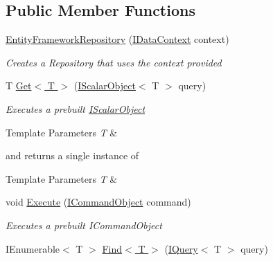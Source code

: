 \subsection*{Public Member Functions}
\begin{DoxyCompactItemize}
\item 
\hyperlink{class_highway_1_1_data_1_1_entity_framework_1_1_repositories_1_1_entity_framework_repository_a9f5b6355d4a5054c37bcd19a6a444aca}{Entity\-Framework\-Repository} (\hyperlink{interface_highway_1_1_data_1_1_interfaces_1_1_i_data_context}{I\-Data\-Context} context)
\begin{DoxyCompactList}\small\item\em Creates a Repository that uses the context provided \end{DoxyCompactList}\item 
T \hyperlink{class_highway_1_1_data_1_1_entity_framework_1_1_repositories_1_1_entity_framework_repository_a96b10f64c2c73cdc8c19ceed3f97004d}{Get$<$ T $>$} (\hyperlink{interface_highway_1_1_data_1_1_interfaces_1_1_i_scalar_object-g}{I\-Scalar\-Object}$<$ T $>$ query)
\begin{DoxyCompactList}\small\item\em Executes a prebuilt \hyperlink{class_i_scalar_object-g}{I\-Scalar\-Object}
\begin{DoxyTemplParams}{Template Parameters}
{\em T} & \\
\hline
\end{DoxyTemplParams}
and returns a single instance of 
\begin{DoxyTemplParams}{Template Parameters}
{\em T} & \\
\hline
\end{DoxyTemplParams}
\end{DoxyCompactList}\item 
void \hyperlink{class_highway_1_1_data_1_1_entity_framework_1_1_repositories_1_1_entity_framework_repository_a2cf1765e57f0e5527e2c36888eaf38f9}{Execute} (\hyperlink{interface_highway_1_1_data_1_1_interfaces_1_1_i_command_object}{I\-Command\-Object} command)
\begin{DoxyCompactList}\small\item\em Executes a prebuilt I\-Command\-Object \end{DoxyCompactList}\item 
I\-Enumerable$<$ T $>$ \hyperlink{class_highway_1_1_data_1_1_entity_framework_1_1_repositories_1_1_entity_framework_repository_af361e5a4bc1f44f9165cc450add06ece}{Find$<$ T $>$} (\hyperlink{interface_highway_1_1_data_1_1_interfaces_1_1_i_query-g}{I\-Query}$<$ T $>$ query)

\end{DoxyCompactItemize}
